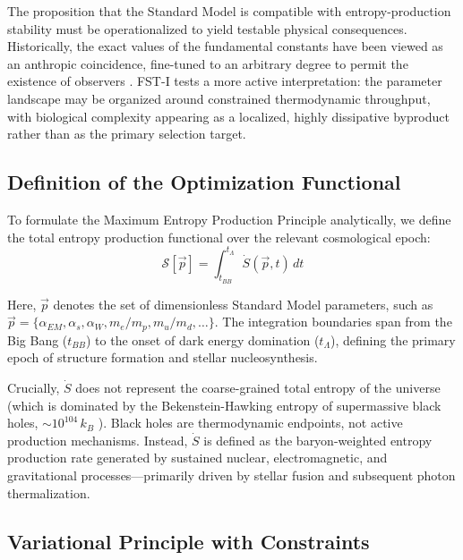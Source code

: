 \documentclass[12pt,a4paper]{article}
\theoremstyle{remark}
\begin{document}
The proposition that the Standard Model is compatible with entropy-production stability must be operationalized to yield testable physical consequences. Historically, the exact values of the fundamental constants have been viewed as an anthropic coincidence, fine-tuned to an arbitrary degree to permit the existence of observers \citep{Adams2019}. FST-I tests a more active interpretation: the parameter landscape may be organized around constrained thermodynamic throughput, with biological complexity appearing as a localized, highly dissipative byproduct rather than as the primary selection target.

\subsection{Definition of the Optimization Functional}

To formulate the Maximum Entropy Production Principle analytically, we define the total entropy production functional over the relevant cosmological epoch:
\begin{equation}
\mathcal{S}[\vec{p}] = \int_{t_{BB}}^{t_\Lambda} \dot{S}(\vec{p}, t) \, dt
\end{equation}

Here, $\vec{p}$ denotes the set of dimensionless Standard Model parameters, such as $\vec{p} = \{\alpha_{EM}, \alpha_s, \alpha_W, m_e/m_p, m_u/m_d, \ldots\}$. The integration boundaries span from the Big Bang ($t_{BB}$) to the onset of dark energy domination ($t_\Lambda$), defining the primary epoch of structure formation and stellar nucleosynthesis.

Crucially, $\dot{S}$ does not represent the coarse-grained total entropy of the universe (which is dominated by the Bekenstein-Hawking entropy of supermassive black holes, $\sim 10^{104}\,k_B$ \citep{EntropyMaximum}). Black holes are thermodynamic endpoints, not active production mechanisms. Instead, $\dot{S}$ is defined as the baryon-weighted entropy production rate generated by sustained nuclear, electromagnetic, and gravitational processes---primarily driven by stellar fusion and subsequent photon thermalization.

\subsection{Variational Principle with Constraints}
\end{document}
